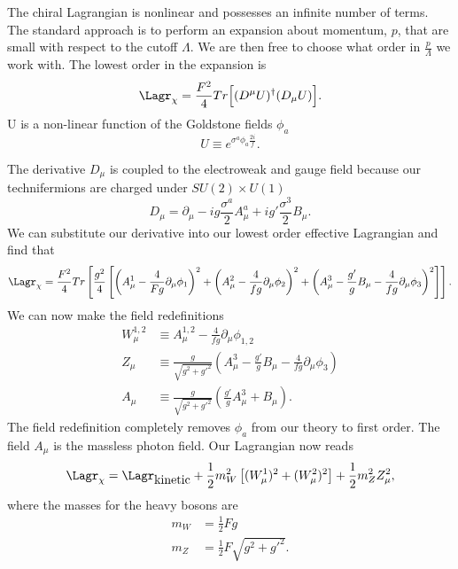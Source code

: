 The chiral Lagrangian is nonlinear and possesses an infinite number of terms.
The standard approach is to perform an expansion about momentum, $p$, that are small with respect to the cutoff $\Lambda$.
We are then free to choose what order in $\frac{p}{\Lambda}$ we work with.
The lowest order in the expansion is
\begin{equation}
  \Lagr_{\chi}=\frac{F^2}{4}Tr\Big[(D^\mu U)^\dagger(D_\mu U)\Big].
\end{equation}
U is a non-linear function of the Goldstone fields $\phi_a$
\begin{equation}
  U\equiv e^{\sigma^a\phi_a\frac{2i}{f}}.
\end{equation}

The derivative $D_\mu$ is coupled to the electroweak and gauge field because our technifermions are charged under $SU(2)\times U(1)$
\begin{equation}
  D_\mu=\partial_\mu - ig\frac{\sigma^a}{2}A^a_\mu+ig'\frac{\sigma^3}{2}B_\mu.
\end{equation}
We can substitute our derivative into our lowest order effective Lagrangian and find that\begin{equation}
  \Lagr_{\chi}=\frac{F^2}{4}Tr\left[\frac{g^2}{4}\left[\left(A^1_\mu-\frac{4}{Fg}\partial_\mu\phi_1\right)^2 + \left(A^2_\mu-\frac{4}{fg}\partial_\mu\phi_2\right)^2 + 
  \left(A^3_\mu-\frac{g'}{g}B_\mu-\frac{4}{fg}\partial_\mu\phi_3\right)^2\right]\right].
\end{equation}
We can now make the field redefinitions
\begin{equation}
  \begin{aligned}
    W^{1,2}_\mu &\equiv A^{1,2}_\mu - \frac{4}{fg}\partial_\mu\phi_{1,2} \\
    Z_\mu &\equiv \frac{g}{\sqrt{g^2+g'^2}}\left(A^3_\mu - \frac{g'}{g}B_\mu - \frac{4}{fg}\partial_\mu\phi_3\right) \\
    A_\mu &\equiv \frac{g}{\sqrt{g^2+g'^2}}\left(\frac{g'}{g}A^3_\mu+B_\mu\right).
  \end{aligned}
\end{equation}
The field redefinition completely removes $\phi_a$ from our theory to first order.
The field $A_\mu$ is the massless photon field.
Our Lagrangian now reads
\begin{equation}
  \Lagr_{\chi}=\Lagr_{\mbox{kinetic}}+\frac{1}{2}m_W^2\left[(W^1_\mu)^2+(W_\mu^2)^2\right]+\frac{1}{2}m_Z^2Z^2_\mu,
\end{equation}
where the masses for the heavy bosons are
\begin{equation}
  \begin{aligned}
    m_W&=\frac{1}{2}Fg \\
    m_Z&=\frac{1}{2}F\sqrt{g^2+g'^2}.
  \end{aligned}
\end{equation}
